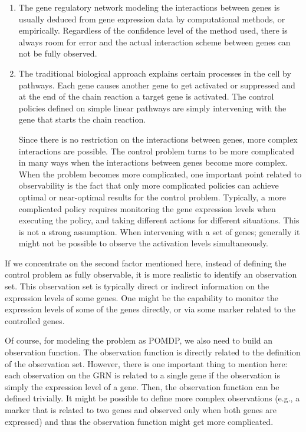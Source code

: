 \begin{enumerate}
\item The gene regulatory network modeling the interactions between genes is usually deduced from gene
expression data by computational methods, or empirically. Regardless of the confidence level of the method
used, there is always room for error and the actual interaction scheme between genes can not be fully
observed.

\item The traditional biological approach explains certain processes in the cell by pathways. Each gene causes another gene to get activated or suppressed and at the end of the chain reaction a target gene is activated. The control policies defined on simple linear pathways are simply intervening with the gene that starts the chain reaction.

Since there is no restriction on the interactions between genes, more complex interactions are possible. The
control problem turns to be more complicated in many ways when the interactions between genes become more
complex. When the problem becomes more complicated, one important point related to observability is the fact
that only more complicated policies can achieve optimal or near-optimal results for the control problem.
Typically, a more complicated policy requires monitoring the gene expression levels when executing the
policy, and taking different actions for different situations. This is not a strong assumption. When
intervening with a set of genes; generally it might not be possible to observe the activation levels
simultaneously.
\end{enumerate}

If we concentrate on the second factor mentioned here, instead of defining the control problem as fully
observable, it is more realistic to identify an observation set. This observation set is typically direct or
indirect information on the expression levels of some genes. One might be the capability to monitor the
expression levels of some of the genes directly, or via some marker related to the controlled genes.

Of course, for modeling the problem as POMDP, we also need to build an observation function. The observation
function is directly related to the definition of the observation set. However, there is one important thing
to mention here: each observation on the GRN is related to a single gene if the observation is simply the
expression level of a gene. Then, the observation function can be defined trivially. It might be possible to
define more complex observations (e.g., a marker that is related to two genes and observed only when both
genes are expressed) and thus the observation function might get more complicated.

